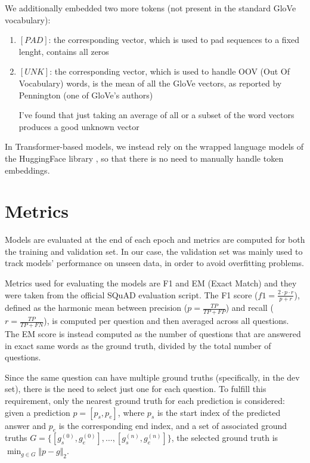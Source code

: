 \documentclass[a4paper,10pt]{report}
\begin{document}
We additionally embedded two more tokens (not present in the standard GloVe vocabulary):
\begin{enumerate}
  \item $[PAD]$: the corresponding vector, which is used to pad sequences to a fixed lenght, contains all zeros
  \item $[UNK]$: the corresponding vector, which is used to handle OOV (Out Of Vocabulary) words, is the mean of all the GloVe vectors, as reported by Pennington (one of GloVe's authors) \cite{unk}
        \begin{displayquote}I've found that just taking an average of all or a subset of the word vectors produces a good unknown vector \end{displayquote}
\end{enumerate}

In Transformer-based models, we instead rely on the wrapped language models of the HuggingFace library \cite{huggingface}, so that there is no need to manually handle token embeddings.

\section{Metrics}
Models are evaluated at the end of each epoch and metrics are computed for both the training and validation set. In our case, the validation set was mainly used to track models' performance on unseen data, in order to avoid overfitting problems.

Metrics used for evaluating the models are F1 and EM (Exact Match) and they were taken from the official SQuAD evaluation script. The F1 score ($f1=\frac{2\cdot p \cdot r}{p+r}$), defined as the harmonic mean between precision ($p=\frac{TP}{TP+FP}$) and recall ($r=\frac{TP}{TP+FN}$), is computed per question and then averaged across all questions. The EM score is instead computed as the number of questions that are answered in exact same words as the ground truth, divided by the total number of questions.

Since the same question can have multiple ground truths (specifically, in the dev set), there is the need to select just one for each question. To fulfill this requirement, only the nearest ground truth for each prediction is considered: given a prediction $p=[p_s, p_e]$, where $p_s$ is the start index of the predicted answer and $p_e$ is the corresponding end index, and a set of associated ground truths $G=\{[g_s^{(0)},g_e^{(0)}], \dots, [g_s^{(n)},g_e^{(n)}]\}$, the selected ground truth is $\min_{g\in G}\Vert p - g\Vert_2$.
\end{document}
